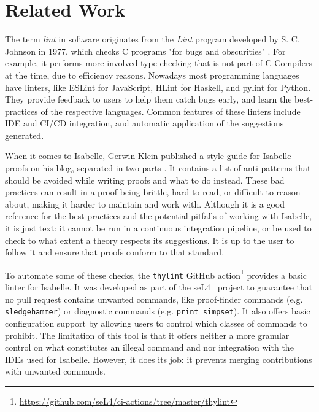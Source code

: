 \chapter{Related Work}\label{chapter:related}
The term \textit{lint} in software originates from the 
\textit{Lint} program developed by S. C. Johnson in 1977, which checks C
programs "for bugs and obscurities" \cite{johnson1977lint}. For example, 
it performs
more involved type-checking that is not part of C-Compilers at
the time, due to efficiency reasons. Nowadays
most programming languages have linters, like ESLint \cite{eslint}
for JavaScript, HLint \cite{hlint} for Haskell, and pylint \cite{pylint} 
for Python.
They provide feedback to users to help them catch bugs early, and learn
the best-practices of the respective languages. Common features of
these linters include IDE and CI/CD integration, and 
automatic application of the suggestions generated.


When it comes to Isabelle, Gerwin Klein published a style guide for Isabelle proofs on his 
blog, separated in two parts \parencite{klein_2015,klein_2015_2}. It contains a 
list of anti-patterns that should be avoided while writing proofs
and what to do instead. These bad practices can result in a proof
being brittle, hard to read, or difficult to reason about, making it 
harder to maintain and work with. Although it is a good reference for the best practices and the potential pitfalls of working with 
Isabelle, it is just text: it cannot be run in a continuous 
integration pipeline, or be used to check to what extent a theory
respects its suggestions. It is up to the user to follow it and ensure that 
proofs conform to that standard. 

To automate some of these checks, the \texttt{thylint} GitHub
action\footnote{\url{https://github.com/seL4/ci-actions/tree/master/thylint}} provides
a basic linter for
Isabelle. It was developed as part of the seL4~\parencite{sel4}
project to guarantee that no pull request contains unwanted commands, like
proof-finder commands (e.g. \texttt{sledgehammer}) or diagnostic
commands (e.g. \texttt{print\_simpset}). It also offers basic 
configuration support by allowing users to control which classes
of commands to prohibit. The limitation of this tool is that
it offers neither a more granular control on what constitutes
an illegal command and nor integration with
the IDEs used for Isabelle. However, it does its job: it prevents merging
contributions with unwanted commands.

